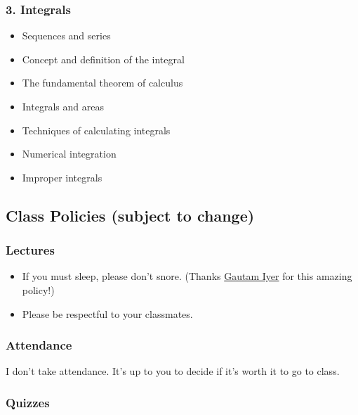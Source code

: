 \documentclass[
]{article}
\providecommand{\tightlist}{%
  \setlength{\itemsep}{0pt}\setlength{\parskip}{0pt}}
\begin{document}
\subsubsection*{3. Integrals}\label{integrals}

\begin{itemize}
\item
  Sequences and series
\item
  Concept and definition of the integral
\item
  The fundamental theorem of calculus
\item
  Integrals and areas
\item
  Techniques of calculating integrals
\item
  Numerical integration
\item
  Improper integrals
\end{itemize}

\subsection*{Class Policies (subject to change)}\label{class-policies-subject-to-change}

\subsubsection*{Lectures}\label{lectures}

\begin{itemize}
\tightlist
\item
  If you must sleep, please don't snore. (Thanks \href{https://www.math.cmu.edu/~gautam/}{Gautam Iyer} for this amazing policy!)
\item
  Please be respectful to your classmates.
\end{itemize}

\subsubsection*{Attendance}\label{attendance}

I don't take attendance. It's up to you to decide if it's worth it to go to
class.

\subsubsection*{Quizzes}\label{quizzes}
\end{document}
